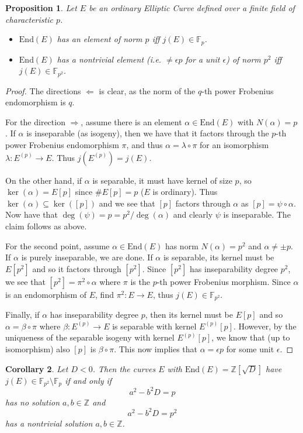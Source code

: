 \documentclass{scrartcl}
\newcommand{\Z}{\mathbb{Z}}
\newcommand{\F}{\mathbb{F}}
\newcommand{\End}{\mathrm{End}}
\newtheorem{prop}{Proposition}[section]
\newtheorem{corollary}[prop]{Corollary}
\theoremstyle{definition}
\begin{document}
\begin{prop}
    Let $E$ be an ordinary Elliptic Curve defined over a finite field of characteristic $p$.
    \begin{itemize}
        \item $\End(E)$ has an element of norm $p$ iff $j(E) \in \F_p$.
        \item $\End(E)$ has a nontrivial element (i.e. $\neq \epsilon p$ for a unit $\epsilon$) of norm $p^2$ iff $j(E) \in \F_{p^2}$. 
    \end{itemize}
\end{prop}
\begin{proof}
    The directions $\Leftarrow$ is clear, as the norm of the $q$-th power Frobenius endomorphism is $q$.

    For the direction $\Rightarrow$, assume there is an element $\alpha \in \End(E)$ with $N(\alpha) = p$.
    If $\alpha$ is inseparable (as isogeny), then we have that it factors through the $p$-th power Frobenius endomorphism $\pi$, and thus $\alpha = \lambda \circ \pi$ for an isomorphism $\lambda: E^{(p)} \to E$.
    Thus $j(E^{(p)}) = j(E)$.

    On the other hand, if $\alpha$ is separable, it must have kernel of size $p$, so $\ker(\alpha) = E[p]$ since $\#E[p] = p$ ($E$ is ordinary).
    Thus $\ker(\alpha) \subseteq \ker([p])$ and we see that $[p]$ factors through $\alpha$ as $[p] = \psi \circ \alpha$.
    Now have that $\deg(\psi) = p = p^2/\deg(\alpha)$ and clearly $\psi$ is inseparable.
    The claim follows as above.

    For the second point, assume $\alpha \in \End(E)$ has norm $N(\alpha) = p^2$ and $\alpha \neq \pm p$.
    If $\alpha$ is purely inseparable, we are done.
    If $\alpha$ is separable, its kernel must be $E[p^2]$ and so it factors through $[p^2]$.
    Since $[p^2]$ has inseparability degree $p^2$, we see that $[p^2] = \pi^2 \circ \alpha$ where $\pi$ is the $p$-th power Frobenius morphism.
    Since $\alpha$ is an endomorphism of $E$, find $\pi^2: E \to E$, thus $j(E) \in \F_{p^2}$.

    Finally, if $\alpha$ has inseparability degree $p$, then its kernel must be $E[p]$ and so $\alpha = \beta \circ \pi$ where $\beta: E^{(p)} \to E$ is separable with kernel $E^{(p)}[p]$.
    However, by the uniqueness of the separable isogeny with kernel $E^{(p)}[p]$, we know that (up to isomorphism) also $[p]$ is $\beta \circ \pi$.
    This now implies that $\alpha = \epsilon p$ for some unit $\epsilon$.
\end{proof}
\begin{corollary}
    Let $D < 0$.
    Then the curves $E$ with $\End(E) = \Z[\sqrt{D}]$ have $j(E) \in \F_{p^2} \setminus \F_p$ if and only if
    \begin{equation*}
        a^2 - b^2 D = p
    \end{equation*}
    has no solution $a, b \in \Z$ and
    \begin{equation*}
        a^2 - b^2 D = p^2
    \end{equation*}
    has a nontrivial solution $a, b \in \Z$.
\end{corollary}
\end{document}
